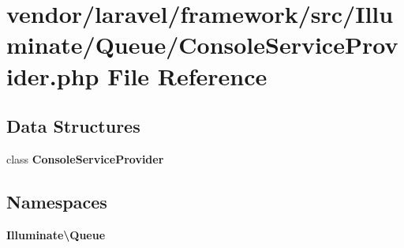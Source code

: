 \section{vendor/laravel/framework/src/\+Illuminate/\+Queue/\+Console\+Service\+Provider.php File Reference}
\label{_console_service_provider_8php}
\subsection*{Data Structures}
\begin{DoxyCompactItemize}
\item 
class {\bf Console\+Service\+Provider}
\end{DoxyCompactItemize}
\subsection*{Namespaces}
\begin{DoxyCompactItemize}
\item 
 {\bf Illuminate\textbackslash{}\+Queue}
\end{DoxyCompactItemize}
